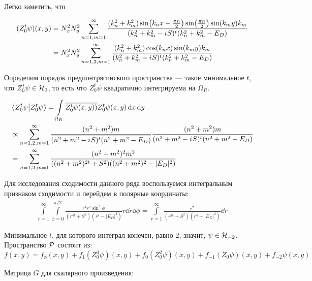 Легко заметить, что 

\begin{align*}
(Z_0^t \psi)(x, y)
&= N_x^2 N_y^2 \sum\limits_{n = 1, m = 1}^\infty \frac{(k_n^2 + k_m^2) \sin(k_n x + \frac{\pi n}{2}) \sin(\frac{\pi n}{2}) \sin(k_m y) k_m}{(k_n^2 + k_m^2 - {i\mkern1mu} S)^t (k_n^2 + k_m^2 - E_D)} \\
&= N_x^2 N_y^2 \sum\limits_{n = 1,2, m = 1}^\infty \frac{(k_n^2 + k_m^2) \cos(k_n x) \sin(k_m y) k_m}{(k_n^2 + k_m^2 - {i\mkern1mu} S)^t (k_n^2 + k_m^2 - E_D)}
\end{align*}


Определим порядок предпонтрягинского пространства — такое минимальное $t$, что $Z_0^t \psi \in \mathcal{H}_{0}$, то есть что $Z_0^t \psi$ квадратично интегрируема на $\Omega_R$.

\begin{align*}
& \ip{Z_0^t \psi}{Z_0^t \psi} = \int\limits_{\Omega_R} \cconj{Z_0^t \psi(x, y))} Z_0^t \psi(x, y) \dd{x} \dd{y} \\
&\propto \sum\limits_{n = 1,2, m = 1}^\infty \frac{(n^2 + m^2) m}{\cconj{(n^2 + m^2 - \iu S)^t (n^2 + m^2 - E_D)}} \frac{(n^2 + m^2) m}{(n^2 + m^2 - \iu S)^t (n^2 + m^2 - E_D)} \\
&= \sum\limits_{n = 1,2, m = 1}^\infty \frac{(n^2 + m^2)^2 m^2}{((n^2 + m^2)^{2t} + S^2) ((n^2 + m^2)^{2} - |E_D|^2)} 
\end{align*}

Для исследования сходимости данного ряда воспользуемся интегральным признаком сходимости и перейдем в полярные координаты:
\begin{align*}
\int\limits_{r = 1}^\infty \int\limits_{\phi = 0}^{\pi / 2} \frac{r^4 r^2 \sin^2 \phi}{(r^{4t} + S^2) (r^{4} - |E_D|^2)} r \dd{r} \dd{\phi}
= \int\limits_{r = 1}^\infty \frac{r^7}{(r^{4t} + S^2) (r^{4} - |E_D|^2)} \dd{r}
\end{align*}

Минимальное $t$, для которого интеграл конечен, равно $2$, значит, $\psi \in \mathcal{H}_{-2}$. Пространство $\mathcal{P}$ состоит из:
\[
f(x, y) = f_\phi(x, y) + f_{1} (Z_0^3 \psi)(x, y) + f_{0} (Z_0^2 \psi)(x, y) + f_{-1} (Z_0 \psi)(x, y) + f_{-2} \psi(x, y)
\]

Матрица $G$ для скалярного произведения:


